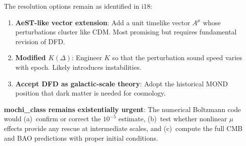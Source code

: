 \documentclass[aps,prd,twocolumn,nofootinbib]{revtex4-2}
\begin{document}
The resolution options remain as identified in i18:
\begin{enumerate}
\item \textbf{AeST-like vector extension}: Add a unit timelike vector
  $A^\mu$ whose perturbations cluster like CDM. Most promising but
  requires fundamental revision of DFD.
\item \textbf{Modified $K(\Delta)$}: Engineer $K$ so that the
  perturbation sound speed varies with epoch. Likely introduces
  instabilities.
\item \textbf{Accept DFD as galactic-scale theory}: Adopt the
  historical MOND position that dark matter is needed for cosmology.
\end{enumerate}

\textbf{mochi\_class remains existentially urgent}: The numerical
Boltzmann code would (a)~confirm or correct the $10^{-5}$ estimate,
(b)~test whether nonlinear $\mu$ effects provide any rescue at
intermediate scales, and (c)~compute the full CMB and BAO predictions
with proper initial conditions.
\end{document}

